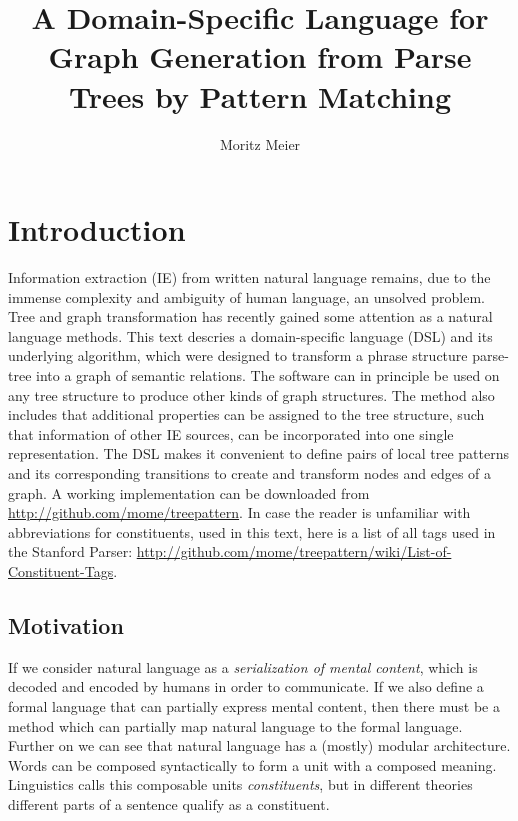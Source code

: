 \documentclass[english]{article}
\begin{document}
\title{A Domain-Specific Language for Graph Generation from Parse Trees by Pattern Matching}
\author{Moritz Meier}
\maketitle

\section{Introduction}

Information extraction (IE) from written natural language remains, due to the immense complexity and ambiguity of human language, an unsolved problem. Tree and graph transformation has recently gained some attention as a natural language methods\cite{ribeyre_linguistically-motivated_2012}. This text descries a domain-specific language (DSL) and its underlying algorithm, which were designed to transform a phrase structure parse-tree into a graph of semantic relations. The software can in principle be used on any tree structure to produce other kinds of graph structures. The method also includes that additional properties can be assigned to the tree structure, such that information of other IE sources, can be incorporated into one single representation. The DSL makes it convenient to define pairs of local tree patterns and its corresponding transitions to create and transform nodes and edges of a graph. A working implementation can be downloaded from \url{http://github.com/mome/treepattern}. In case the reader is unfamiliar with abbreviations for constituents, used in this text, here is a list of all tags used in the Stanford Parser: \url{http://github.com/mome/treepattern/wiki/List-of-Constituent-Tags}.


\subsection{Motivation}

If we consider natural language as a \textit{serialization of mental content}, which is decoded and encoded by humans in order to communicate. If we also define a formal language that can partially express mental content, then there must be a method which can partially map natural language to the formal language. Further on we can see that natural language has a (mostly) modular architecture. Words can be composed syntactically to form a unit with a composed meaning. Linguistics calls this composable units \textit{constituents}, but in different theories different parts of a sentence qualify as a constituent.
\end{document}
